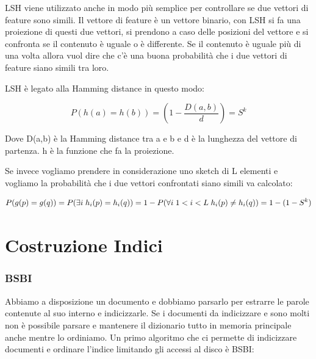 \documentclass[14pt]{extreport}
\begin{document}
LSH viene utilizzato anche in modo più semplice per controllare se due vettori di feature sono simili. Il vettore di feature è un vettore binario, con LSH si fa una proiezione di questi due vettori, si prendono a caso delle posizioni del vettore e si confronta se il contenuto è uguale o è differente.
Se il contenuto è uguale più di una volta allora vuol dire che c'è una buona probabilità che i due vettori di feature siano simili tra loro.

LSH è legato alla Hamming distance in questo modo:

\begin{equation}
    P(h(a) = h(b)) = (1 - \frac{D(a,b)}{d}) = S^k
\end{equation}

Dove D(a,b) è la Hamming distance tra a e b e d è la lunghezza del vettore di partenza. h è la funzione che fa la proiezione.

Se invece vogliamo prendere in considerazione uno sketch di L elementi e vogliamo la probabilità che i due vettori confrontati siano simili va calcolato:

\begin{equation}
    P(g(p)=g(q)) = P(\exists i \; h_i(p) = h_i(q)) = 
    \newline 
    1 - P(\forall i \; 1 < i < L \; h_i(p) \neq h_i(q)) = 1 - (1 - S^k)
\end{equation}

\chapter{Costruzione Indici}



\subsection{BSBI}

Abbiamo a disposizione un documento e dobbiamo parsarlo per estrarre le parole contenute al suo interno e indicizzarle.
Se i documenti da indicizzare e sono molti non è possibile parsare e mantenere il dizionario tutto in memoria principale anche mentre lo ordiniamo.
Un primo algoritmo che ci permette di indicizzare documenti e ordinare l'indice limitando gli accessi al disco è BSBI:
\end{document}
